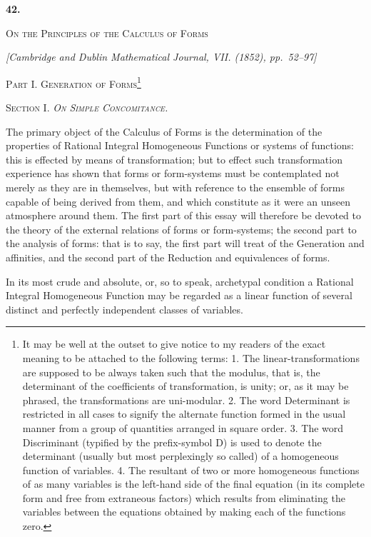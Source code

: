 \documentclass[11pt]{article}
\newcommand{\paperhead}[3]{%
  \clearpage
  \begin{center}
  {\Large\bfseries #1.}\par\vspace{0.85em}
  {\large\scshape #2}\par\vspace{0.6em}
  {\itshape [#3]}\par
  \end{center}\vspace{0.4em}}
\newcommand{\sourcepage}[1]{\marginpar{\scriptsize p.~#1}}
\begin{document}
{{\paperhead{42}{On the Principles of the Calculus of Forms}{Cambridge and Dublin Mathematical Journal, VII. (1852), pp.~52--97}

\sourcepage{284}
\begin{center}
{\scshape Part I. Generation of Forms}\footnote{It may be well at the outset to give notice to my readers of the exact meaning to be attached to the following terms: 1. The linear-transformations are supposed to be always taken such that the modulus, that is, the determinant of the coefficients of transformation, is unity; or, as it may be phrased, the transformations are uni-modular. 2. The word Determinant is restricted in all cases to signify the alternate function formed in the usual manner from a group of quantities arranged in square order. 3. The word Discriminant (typified by the prefix-symbol D) is used to denote the determinant (usually but most perplexingly so called) of a homogeneous function of variables. 4. The resultant of two or more homogeneous functions of as many variables is the left-hand side of the final equation (in its complete form and free from extraneous factors) which results from eliminating the variables between the equations obtained by making each of the functions zero.}\par\medskip
{\scshape Section I. \emph{On Simple Concomitance.}}
\end{center}

The primary object of the Calculus of Forms is the determination of the properties of Rational Integral Homogeneous Functions or systems of functions: this is effected by means of transformation; but to effect such transformation experience has shown that forms or form-systems must be contemplated not merely as they are in themselves, but with reference to the ensemble of forms capable of being derived from them, and which constitute as it were an unseen atmosphere around them. The first part of this essay will therefore be devoted to the theory of the external relations of forms or form-systems; the second part to the analysis of forms: that is to say, the first part will treat of the Generation and affinities, and the second part of the Reduction and equivalences of forms.

In its most crude and absolute, or, so to speak, archetypal condition a Rational Integral Homogeneous Function may be regarded as a linear function of several distinct and perfectly independent classes of variables.

}}
\end{document}
